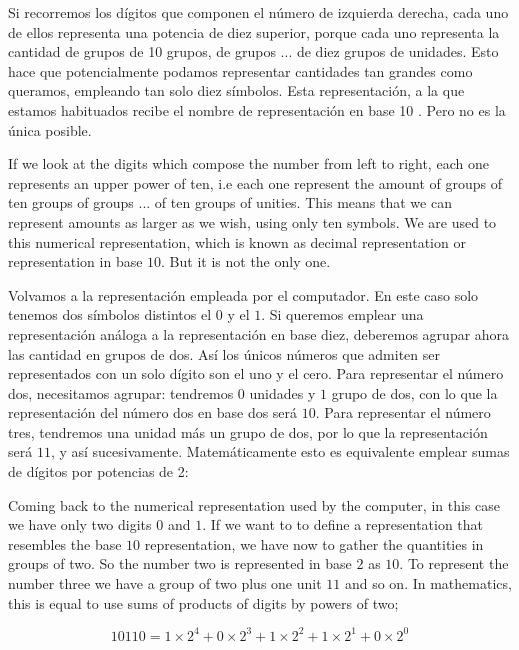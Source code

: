 \begin{paracol}{2}
Si recorremos los dígitos que componen el número de izquierda derecha, cada uno de ellos representa una potencia de diez superior, porque cada uno representa la cantidad de grupos de 10 grupos, de grupos ... de diez grupos de unidades. Esto hace que potencialmente podamos representar cantidades tan grandes como queramos, empleando tan solo diez símbolos. Esta representación, a la que estamos habituados recibe el nombre de representación en base 10 . Pero no es la única posible.

\switchcolumn
If we look at the digits which compose the number from left to right, each one represents an upper power of ten, i.e each one represent the amount of groups of ten groups of groups ... of ten groups of unities. This means that we can represent amounts as larger as we wish, using only ten symbols. We are used to this numerical representation, which is known as decimal representation or representation in base $10$. But it is not the only one.   

\switchcolumn
Volvamos a la representación empleada por el computador. En este caso solo tenemos dos símbolos distintos el $0$ y el $1$. Si queremos emplear una representación análoga a la representación en base diez, deberemos agrupar ahora las cantidad en grupos de dos. Así los únicos números que admiten ser representados con un solo dígito son el uno y el cero. Para representar el número dos, necesitamos agrupar: tendremos $0$ unidades y $1$ grupo de dos, con lo que la representación del número dos en base dos será $10$. Para representar el número tres, tendremos una unidad más un grupo de dos, por lo que la representación será $11$, y así sucesivamente. Matemáticamente esto es equivalente emplear sumas de dígitos por potencias de 2:

\switchcolumn
Coming back to the numerical representation used by the computer, in this case we have only two digits $0$ and $1$. If we want to to define a representation that resembles the base $10$ representation, we have now to gather the quantities in groups of two. So the number two is represented in base $2$ as $10$. To represent the number three we have a group of two plus one unit $11$ and so on. In mathematics, this is equal to use sums of products of digits by powers of two;               
\end{paracol}

\begin{equation*}
10110 = 1\times2^4+0\times2^3+1\times2^2+1\times2^1+0\times2^0 
\end{equation*}

